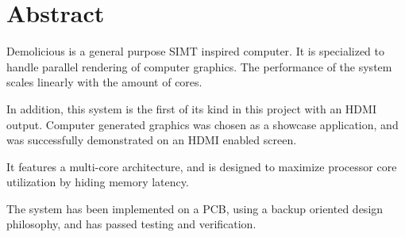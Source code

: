 \documentclass[../main/report.tex]{subfiles}
\begin{document}
\vspace*{\fill}
\chapter*{Abstract}
\label{sec:abstract}

Demolicious is a general purpose SIMT inspired computer.
It is specialized to handle parallel rendering of computer graphics.
The performance of the system scales linearly with the amount of cores.

In addition, this system is the first of its kind in this project with an HDMI output.
Computer generated graphics was chosen as a showcase application,
and was successfully demonstrated on an HDMI enabled screen.

It features a multi-core architecture,
and is designed to maximize processor core utilization by hiding memory latency.

The system has been implemented on a PCB,
using a backup oriented design philosophy, and has passed testing and verification.

\vspace*{\fill}
\end{document}
